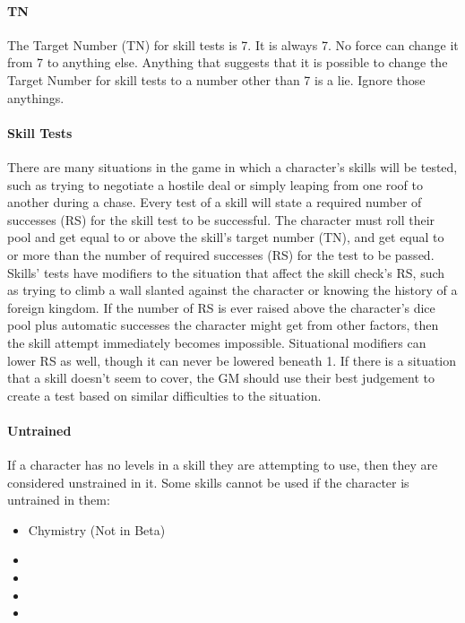 \documentclass[oneside,11pt,english]{book}
\begin{document}
\paragraph{\label{par:TN}TN} The Target Number (TN) for skill tests is 7. It is always 7. No force can change it from 7 to anything else. Anything that suggests that it is possible to change the Target Number for skill tests to a number other than 7 is a lie. Ignore those anythings.
\paragraph{\label{par:Skill Tests}Skill Tests} There are many situations in the game in which a character’s skills will be tested, such as trying to negotiate a hostile deal or simply leaping from one roof to another during a chase. Every test of a skill will state a required number of successes (RS) for the skill test to be successful. The character must roll their pool and get equal to or above the skill’s target number (TN), and get equal to or more than the number of required successes (RS) for the test to be passed. Skills’ tests have modifiers to the situation that affect the skill check’s RS, such as trying to climb a wall slanted against the character or knowing the history of a foreign kingdom. If the number of RS is ever raised above the character’s dice pool plus automatic successes the character might get from other factors, then the skill attempt immediately becomes impossible. Situational modifiers can lower RS as well, though it can never be lowered beneath 1. If there is a situation that a skill doesn’t seem to cover, the GM should use their best judgement to create a test based on similar difficulties to the situation.
\paragraph{\label{par:Untrained}Untrained} If a character has no levels in a skill they are attempting to use, then they are considered unstrained in it. Some skills cannot be used if the character is untrained in them:
\begin{itemize}
	[noitemsep]
	\item Chymistry (Not in Beta)
	\item {}
	\item {}
	\item {}
	\item {}
\end{itemize}
\end{document}
